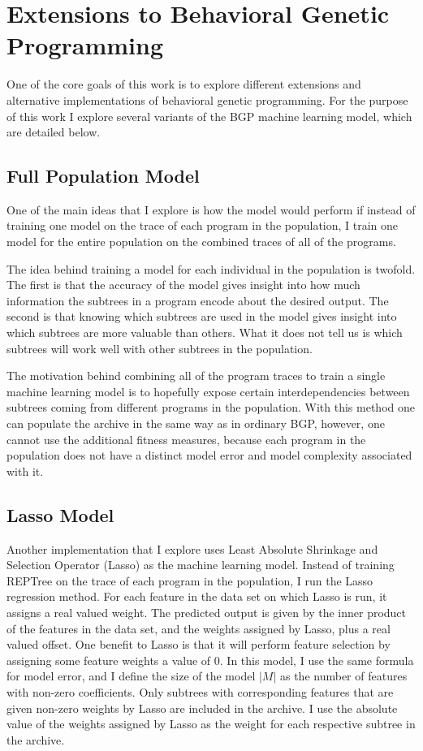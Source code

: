 \section{Extensions to Behavioral Genetic Programming}
\label{section:extensions}
One of the core goals of this work is to explore different extensions and alternative implementations of behavioral genetic programming.  For the purpose of this work I explore several variants of the BGP machine learning model, which are detailed below.

\subsection{Full Population Model}
One of the main ideas that I explore is how the model would perform if instead of training one model on the trace of each program in the population, I train one model for the entire population on the combined traces of all of the programs.

The idea behind training a model for each individual in the population is twofold.  The first is that the accuracy of the model gives insight into how much information the subtrees in a program encode about the desired output. The second is that knowing which subtrees are used in the model gives insight into which subtrees are more valuable than others.  What it does not tell us is which subtrees will work well with other subtrees in the population.

The motivation behind combining all of the program traces to train a single machine learning model is to hopefully expose certain interdependencies between subtrees coming from different programs in the population.  With this method one can populate the archive in the same way as in ordinary BGP, however, one cannot use the additional fitness measures, because each program in the population does not have a distinct model error and model complexity associated with it.

\subsection{Lasso Model}
Another implementation that I explore uses Least Absolute Shrinkage and Selection Operator (Lasso) as the machine learning model.  Instead of training REPTree on the trace of each program in the population, I run the Lasso regression method.  For each feature in the data set on which Lasso is run, it assigns a real valued weight.  The predicted output is given by the inner product of the features in the data set, and the weights assigned by Lasso, plus a real valued offset.  One benefit to Lasso is that it will perform feature selection by assigning some feature weights a value of 0.  In this model, I use the same formula for model error, and I define the size of the model $|M|$ as the number of features with non-zero coefficients.  Only subtrees with corresponding features that are given non-zero weights by Lasso are included in the archive.  I use the absolute value of the weights assigned by Lasso as the weight for each respective subtree in the archive.

